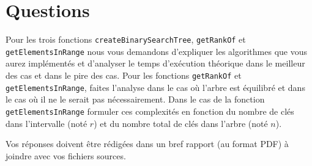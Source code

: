 \documentclass[a4paper,10pt]{article}
\begin{document}
\section{Questions}

Pour les trois fonctions \texttt{createBinarySearchTree},
\texttt{getRankOf} et \texttt{getElementsInRange} nous vous demandons
d'expliquer les algorithmes que vous aurez implémentés et d'analyser
le temps d'exécution théorique dans le meilleur des cas et dans le
pire des cas. Pour les fonctions \texttt{getRankOf} et
\texttt{getElementsInRange}, faites l'analyse dans le cas où l'arbre
est équilibré et dans le cas où il ne le serait pas
nécessairement. Dans le cas de la fonction \texttt{getElementsInRange}
formuler ces complexités en fonction du nombre de clés dans
l'intervalle (noté $r$) et du nombre total de clés dans l'arbre (noté
$n$).

Vos réponses doivent être rédigées dans un bref rapport (au format
PDF) à joindre avec vos fichiers sources.
\end{document}
